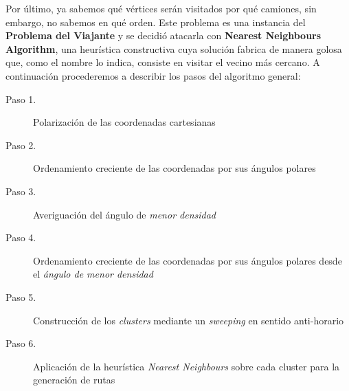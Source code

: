\vskip 8pt

Por último, ya sabemos qué vértices serán visitados por qué camiones, sin embargo, no sabemos en qué orden. Este problema es una instancia del \textbf{Problema del Viajante} y se decidió atacarla con \textbf{Nearest Neighbours Algorithm}, una heurística constructiva cuya solución fabrica de manera golosa que, como el nombre lo indica, consiste en visitar el vecino más cercano. A continuación procederemos a describir los pasos del algoritmo general:

\begin{description}
\item[Paso 1.] Polarización de las coordenadas cartesianas
\item[Paso 2.] Ordenamiento creciente de las coordenadas por sus ángulos polares
\item[Paso 3.] Averiguación del ángulo de \textit{menor densidad}
\item[Paso 4.] Ordenamiento creciente de las coordenadas por sus ángulos polares desde el \textit{ángulo de menor densidad}
\item[Paso 5.] Construcción de los \textit{clusters} mediante un \textit{sweeping} en sentido anti-horario
\item[Paso 6.] Aplicación de la heurística \textit{Nearest Neighbours} sobre cada cluster para la generación de rutas
\end{description}

